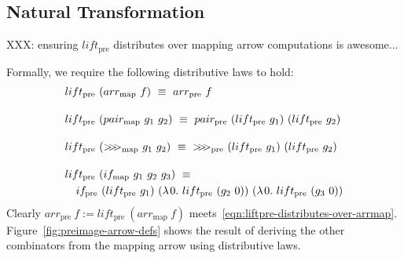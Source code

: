 \documentclass[preprint]{sigplanconf}
\newcommand{\arrowlift}{\ensuremath{lift}}
\newcommand{\arrowarr}{\ensuremath{arr}}
\newcommand{\arrowcomp}{\ensuremath{{>}\mspace{-6mu}{>}\mspace{-6mu}{>}}}
\newcommand{\arrowpair}{\ensuremath{pair}}
\newcommand{\arrowif}{\ensuremath{if}}
\newcommand{\map}{_\mathrm{map}}
\newcommand{\arrmap}{\arrowarr\map}
\newcommand{\compmap}{\arrowcomp\map}
\newcommand{\pairmap}{\arrowpair\map}
\newcommand{\ifmap}{\arrowif\map}
\newcommand{\pre}{_\mathrm{pre}}
\newcommand{\liftpre}{\arrowlift\pre}
\newcommand{\arrpre}{\arrowarr\pre}
\newcommand{\comppre}{\arrowcomp\pre}
\newcommand{\pairpre}{\arrowpair\pre}
\newcommand{\ifpre}{\arrowif\pre}
\begin{document}
\subsection{Natural Transformation}

XXX: ensuring $\liftpre$ distributes over mapping arrow computations is awesome...

Formally, we require the following distributive laws to hold:
\begin{align}
	&\begin{aligned}
		\liftpre~(\arrmap~f) \ \equiv \ \arrpre~f
	\label{eqn:liftpre-distributes-over-arrmap}
	\end{aligned} \\
\nonumber \\[-6pt]
	&\begin{aligned}
		\liftpre~(\pairmap~g_1~g_2) \ \equiv \ \pairpre~(\liftpre~g_1)~(\liftpre~g_2)
	\label{eqn:liftpre-distributes-over-pairmap}
	\end{aligned} \\
\nonumber \\[-6pt]
	&\begin{aligned}
		\liftpre~(\compmap~g_1~g_2) \ \equiv \ \comppre~(\liftpre~g_1)~(\liftpre~g_2)
	\label{eqn:liftpre-distributes-over-compmap}
	\end{aligned} \\
\nonumber \\[-6pt]
	&\begin{aligned}
		&\liftpre~(\ifmap~g_1~g_2~g_3) \ \equiv \ \\
		&\tab\ifpre~(\liftpre~g_1)~(\fun{0}{\liftpre~(g_2~0)})~(\fun{0}{\liftpre~(g_3~0)})
	\label{eqn:liftpre-distributes-over-ifmap}
	\end{aligned}
\end{align}
Clearly $\arrpre~f := \liftpre~(\arrmap~f)$ meets~\eqref{eqn:liftpre-distributes-over-arrmap}.
Figure~\ref{fig:preimage-arrow-defs} shows the result of deriving the other combinators from the mapping arrow using distributive laws.
\end{document}
